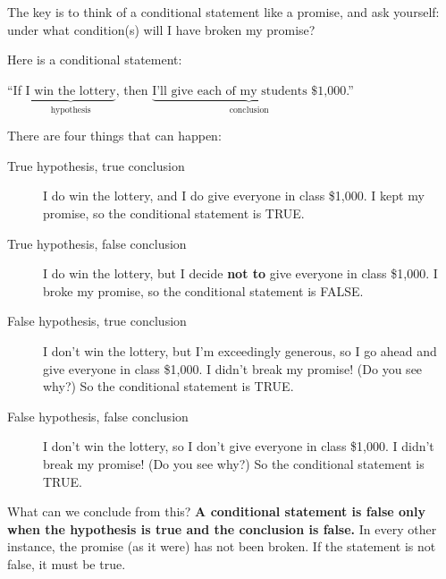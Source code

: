 The key is to think of a conditional statement like a promise, and ask yourself: under what condition(s) will I have broken my promise?

\begin{example}
Here is a conditional statement:
\begin{center}
``If $\underbrace{\text{I win the lottery}}_{\text{hypothesis}}$, then $\underbrace{\text{I'll give  each of my students \$1,000}}_{\text{conclusion}}$.''
\end{center}

There are four things that can happen:
\begin{description}
\item[True hypothesis, true conclusion] I do win the lottery, and I do give everyone in class \$1,000.   I kept my promise, so the conditional statement is TRUE.
\item[True hypothesis, false conclusion] I do win the lottery, but I decide {\bf not to} give everyone in class \$1,000.   I broke my promise, so the conditional statement is FALSE.
\item[False hypothesis, true conclusion] I don't win the lottery, but I'm exceedingly generous, so I go ahead and give everyone in class \$1,000.  I didn't break my promise!  (Do you see why?)  So the conditional statement is TRUE.
\item[False hypothesis, false conclusion] I don't win the lottery,  so I don't give everyone in class \$1,000.  I didn't break my promise!  (Do you see why?)  So the conditional statement is TRUE.
\end{description}
\end{example}

What can we conclude from this?  {\bf A conditional statement is false only when the hypothesis is true and the conclusion is false.}  In every other instance, the promise (as it were) has not been broken.  If the statement is not false, it must be true.


